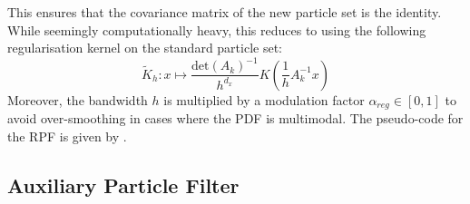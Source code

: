 This ensures that the covariance matrix of the new particle set is the identity. While seemingly computationally heavy, this reduces to using the following regularisation kernel on the standard particle set:
\begin{equation}
	\tilde{K}_h:x\mapsto\frac{\text{det}(A_k)^{-1}}{h^{d_x}}K\left(\frac{1}{h}A_k^{-1}x\right)
\end{equation}
Moreover, the bandwidth $h$ is multiplied by a modulation factor $\alpha_{reg}\in[0,1]$ to avoid over-smoothing in cases where the PDF is multimodal. The pseudo-code for the RPF is given by .

\begin{algorithm}[H]
	\begin{algorithmic}
	\EndIf
	\end{algorithmic}\caption{Regularised Particle Filter}\label{alg:RPF}
\end{algorithm}

\subsection{Auxiliary Particle Filter}

